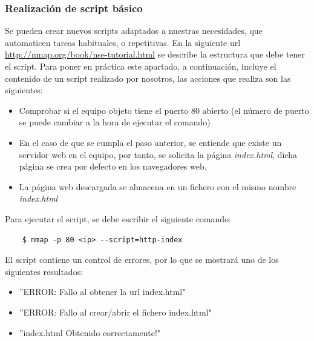 \documentclass[a4,12pt,onecolum]{article}
\begin{document}
\begin{itemize}
\subsubsection{Realización de script básico}
Se pueden crear nuevos scripts adaptados a nuestras necesidades, que automaticen tareas habituales, o repetitivas. En la siguiente url \url{http://nmap.org/book/nse-tutorial.html} se describe la estructura que debe tener el script. Para poner en práctica este apartado, a continuación, incluye el contenido de un script realizado por nosotros, las acciones que realiza son las siguientes:
\begin{itemize}
\item Comprobar si el equipo objeto tiene el puerto 80 abierto (el número de puerto se puede cambiar a la hora de ejecutar el comando)
\item En el caso de que se cumpla el paso anterior, se entiende que existe un servidor web en el equipo, por tanto, se solicita la página \textit{index.html}, dicha página se crea por defecto en los navegadores web.
\item La página web descargada se almacena en un fichero con el mismo nombre \textit{index.html}
\end{itemize} 
Para ejecutar el script, se debe escribir el siguiente comando:
\begin{verbatim}
	$ nmap -p 80 <ip> --script=http-index 
\end{verbatim}
El script contiene un control de errores, por lo que se mostrará uno de los siguientes resultados:
\begin{itemize}
	\item ''ERROR: Fallo al obtener la url index.html"
	\item ''ERROR: Fallo al crear/abrir el fichero index.html"
	\item ''index.html Obtenido correctamente!"
\end{itemize}

\end{itemize}
\end{document}
